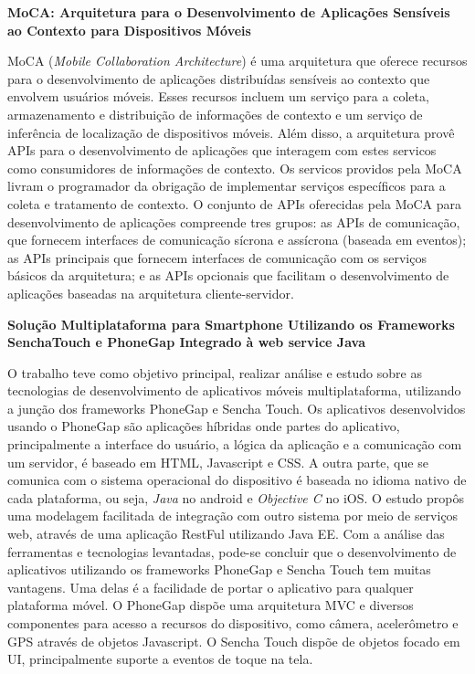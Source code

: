 \textbf{MoCA: Arquitetura para o Desenvolvimento de Aplicações Sensíveis ao Contexto para Dispositivos Móveis}\par
MoCA (\textit{Mobile Collaboration Architecture}) é uma arquitetura que oferece recursos para o desenvolvimento de aplicações distribuídas sensíveis ao contexto que envolvem usuários móveis. Esses recursos incluem um serviço para a coleta, armazenamento e distribuição de informações de contexto e um serviço de inferência de localização de dispositivos móveis. Além disso, a arquitetura provê APIs para o desenvolvimento de aplicações que interagem com estes servicos como consumidores de informações de contexto. Os servicos providos pela MoCA livram o programador da obrigação de implementar serviços específicos para a coleta e tratamento de contexto. O conjunto de APIs oferecidas pela MoCA para desenvolvimento de aplicações compreende tres grupos: as APIs de comunicação, que fornecem interfaces de comunicação sícrona e assícrona (baseada em eventos); as APIs principais que fornecem interfaces de comunicação com os serviços básicos da arquitetura; e as APIs opcionais que facilitam o desenvolvimento de aplicações baseadas na arquitetura cliente-servidor.\par


\textbf{Solução Multiplataforma para Smartphone Utilizando os Frameworks SenchaTouch e PhoneGap Integrado à web service Java}\par
O trabalho teve como objetivo principal, realizar análise e estudo sobre as tecnologias de desenvolvimento de aplicativos móveis multiplataforma, utilizando a junção dos frameworks PhoneGap e Sencha Touch. Os aplicativos desenvolvidos usando o PhoneGap são aplicações híbridas onde partes do aplicativo, principalmente a interface do usuário, a lógica da aplicação e a comunicação com um servidor, é baseado em HTML, Javascript e CSS. A outra parte, que se comunica com o sistema operacional do dispositivo é baseada no idioma nativo de cada plataforma, ou seja, \textit{Java} no android e \textit{Objective C} no iOS. O estudo propôs uma modelagem facilitada de integração com outro sistema por meio de serviços web, através de uma aplicação RestFul utilizando Java EE. Com a análise das ferramentas e tecnologias levantadas, pode-se concluir que o desenvolvimento de aplicativos utilizando os frameworks PhoneGap e Sencha Touch tem muitas vantagens. Uma delas é a facilidade de portar o aplicativo para qualquer plataforma móvel. O  PhoneGap dispõe uma arquitetura MVC e diversos componentes para acesso a recursos do dispositivo, como câmera, acelerômetro e GPS através de objetos Javascript. O Sencha Touch dispõe de objetos focado em UI, principalmente suporte a eventos de toque na tela.\par


